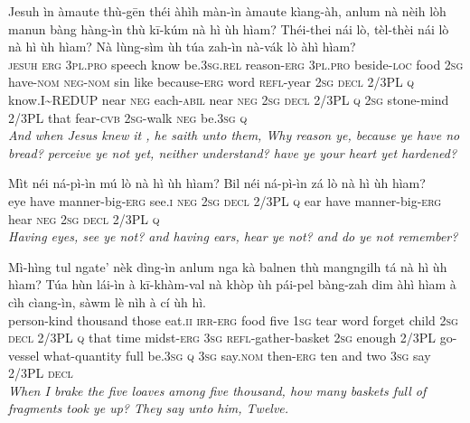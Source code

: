 \documentclass[11pt,a4paper]{article}
\begin{document}
\begin{exe}
\gll Jesuh ìn àmaute thù-gēn théi àhìh màn-ìn àmaute kìang-àh, anlum nà nèih lòh manun bàng hàng-ìn thù kī-kúm nà hì ùh hìam? Théi-thei nái lò, tèl-thèi nái lò nà hì ùh hìam? Nà lùng-sìm ùh túa zah-ìn nà-vák lò àhì hìam? \\
     \textsc{jesuh} \textsc{erg} \textsc{3pl}.\textsc{pro} speech know be.\textsc{3sg}.\textsc{rel} reason-\textsc{erg} \textsc{3pl}.\textsc{pro} beside-\textsc{loc} food \textsc{2sg} have-\textsc{nom} \textsc{neg}-\textsc{nom} sin like because-\textsc{erg} word \textsc{refl}-year \textsc{2sg} \textsc{decl} 2/3PL \textsc{q} know.I\textasciitilde{}REDUP near \textsc{neg} each-\textsc{abil} near \textsc{neg} \textsc{2sg} \textsc{decl} 2/3PL \textsc{q} \textsc{2sg} stone-mind 2/3PL that fear-\textsc{cvb} \textsc{2sg}-walk \textsc{neg} be.\textsc{3sg} \textsc{q} \\
\glt \textcolor{kjvcolor}{\textit{And when Jesus knew it , he saith unto them, Why reason ye, because ye have no bread? perceive ye not yet, neither understand? have ye your heart yet hardened?}}

\gll Mìt néi ná-pì-ìn mú lò nà hì ùh hìam? Bil néi ná-pì-ìn zá lò nà hì ùh hìam? \\
     eye have manner-big-\textsc{erg} see.\textsc{i} \textsc{neg} \textsc{2sg} \textsc{decl} 2/3PL \textsc{q} ear have manner-big-\textsc{erg} hear \textsc{neg} \textsc{2sg} \textsc{decl} 2/3PL \textsc{q} \\
\glt \textcolor{kjvcolor}{\textit{Having eyes, see ye not? and having ears, hear ye not? and do ye not remember?}}

\gll Mì-hìng tul ngate' nèk dìng-ìn anlum nga kà balnen thù mangngilh tá nà hì ùh hìam? Túa hùn lái-ìn à kī-khàm-val nà khòp ùh pái-pel bàng-zah dim àhì hìam à cìh cìang-ìn, sàwm lè nìh à cí ùh hì. \\
     person-kind thousand those eat.\textsc{ii} \textsc{irr}-\textsc{erg} food five \textsc{1sg} tear word forget child \textsc{2sg} \textsc{decl} 2/3PL \textsc{q} that time midst-\textsc{erg} \textsc{3sg} \textsc{refl}-gather-basket \textsc{2sg} enough 2/3PL go-vessel what-quantity full be.\textsc{3sg} \textsc{q} \textsc{3sg} say.\textsc{nom} then-\textsc{erg} ten and two \textsc{3sg} say 2/3PL \textsc{decl} \\
\glt \textcolor{kjvcolor}{\textit{When I brake the five loaves among five thousand, how many baskets full of fragments took ye up? They say unto him, Twelve.}}


\end{exe}
\end{document}
